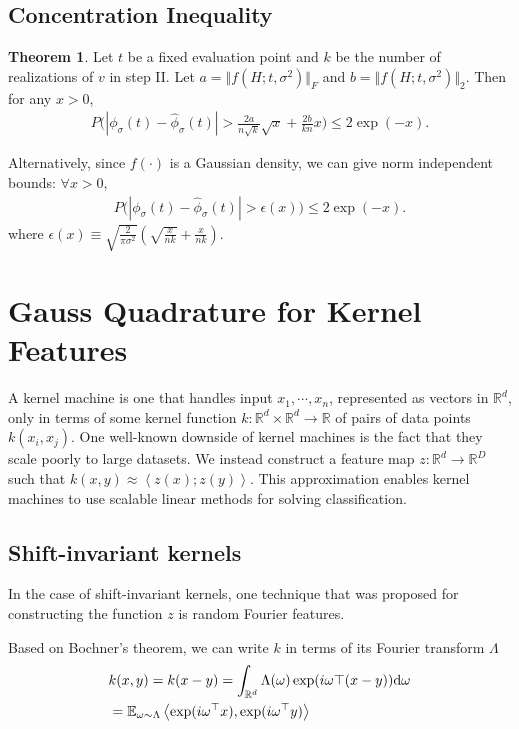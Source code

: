 \documentclass[conference]{IEEEtran}
\newcommand{\R}{\mathbb{R}}
\newcommand{\phis}{\phi_{\sigma}}
\DeclareMathOperator{\1}{\mathbf{1}}
\theoremstyle{definition}
\newtheorem{theorem}{Theorem}
\begin{document}
        \subsection{Concentration Inequality}
        \begin{theorem}\label{cor:phi_concentrate}
            Let $t$ be a fixed evaluation point and $k$ be the number of realizations of $v$ in step II. Let $a = \Vert f(H; t, \sigma^2) \Vert_F$ and $b = \Vert f(H; t, \sigma^2) \Vert_2$. Then for any $x>0$, 
            \begin{align*} 
            P\bigg(|\phis(t) - \widehat{\phi}_{\sigma}(t)| > \frac{2a}{n\sqrt{k}} \sqrt{x} +  \frac{2b}{k n} x \bigg) \leq 2\exp(-x).
            \end{align*}
            
            Alternatively, since $f(\cdot)$ is a Gaussian density, we can give norm independent bounds:  $\forall x > 0$, 
            \begin{align} \label{eq:worst_case}
            P\bigg(|\phis(t) - \widehat{\phi}_{\sigma}
            (t)| > \epsilon(x) \bigg) \leq 2\exp(-x).
            \end{align}
            where $\epsilon(x) \equiv \sqrt{\frac{2}{\pi \sigma^2}} (\sqrt{\frac{x}{nk}} + \frac{x}{nk})$.
        \end{theorem}

        
\section{Gauss Quadrature for Kernel Features}
A kernel
machine is one that handles input $x_1,\cdots,x_n$, represented as vectors in $\R^d$, only in terms of some
kernel function $k:\R^d\times \R^d \to \R$ of pairs of data points $k(x_i, x_j)$. One well-known downside of kernel machines is the fact that they scale poorly to large datasets. We instead construct a feature map $z:\R^d\to \R^D$ such that $k(x,y) \approx \left<z(x); z(y)\right>$.
This approximation enables kernel machines to use scalable linear methods for solving classification.

\subsection{Shift-invariant kernels}
In the case of shift-invariant kernels, one technique that was proposed for constructing the function $z$ is random Fourier features. 

Based on Bochner's theorem, we can write $k$ in terms of its Fourier transform $\Lambda$ 
\begin{equation}    \label{eq:bochner}
    \begin{split}
        &k(x,y)=k(x-y)=\int_{\R^d} \Lambda(\omega) \exp(i\omega\top (x-y)) {\rm d}\omega\\
    &=\mathbb{E}_{\omega\sim \Lambda} \left<\exp(i\omega^\top x),\exp(i\omega^\top y)\right>
    \end{split}
\end{equation}
\end{document}
